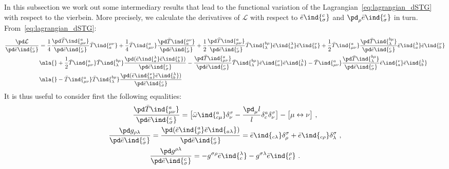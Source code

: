 \documentclass[11pt]{article}
\begin{document}
In this subsection we work out some intermediary results that 
lead to the functional variation of the 
Lagrangian~\eqref{eq:lagrangian_dSTG} with respect to the 
vierbein. More precisely, we calculate the derivatives of 
$\mathcal{L}$ with respect to $\bar{e}\ind{^c_\sigma}$ and 
$\pd_\rho \bar{e}\ind{^c_\sigma}$ in turn.  
From~\eqref{eq:lagrangian_dSTG}:
\begin{displaymath}
\begin{split}
	\frac{\pd \mathcal{L}}{\pd \bar{e}\ind{^c_\sigma}}
	&= \frac{1}{4} \frac{\pd \bar{T}\ind{^a_{\mu\nu}}}{\pd 
		\bar{e}\ind{^c_\sigma}} \bar{T}\ind{_a^{\mu\nu}}
	+ \frac{1}{4} \bar{T}\ind{^a_{\mu\nu}} \frac{\pd 
		\bar{T}\ind{_a^{\mu\nu}}}{\pd \bar{e}\ind{^c_\sigma}}
	+ \frac{1}{2} \frac{\pd \bar{T}\ind{^a_{\mu\nu}}}{\pd 
		\bar{e}\ind{^c_\sigma}} \bar{T}\ind{^{b\mu}_\lambda} 
	\bar{e}\ind{_a^\lambda} \bar{e}\ind{_b^\nu}
	+ \frac{1}{2} \bar{T}\ind{^a_{\mu\nu}} \frac{\pd 
		\bar{T}\ind{^{b\mu}_\lambda}}{\pd \bar{e}\ind{^c_\sigma}} 
	\bar{e}\ind{_a^\lambda} \bar{e}\ind{_b^\nu}
	\\
	&\nla{} + \frac{1}{2} \bar{T}\ind{^a_{\mu\nu}} 
	\bar{T}\ind{^{b\mu}_\lambda} \frac{\pd( 
		\bar{e}\ind{_a^\lambda} \bar{e}\ind{_b^\nu})}{\pd 
		\bar{e}\ind{^c_\sigma}}
	- \frac{\pd \bar{T}\ind{^a_{\mu\nu}}}{\pd 
		\bar{e}\ind{^c_\sigma}} \bar{T}\ind{^{b\mu}_\lambda} 
	\bar{e}\ind{_a^\nu} \bar{e}\ind{_b^\lambda}
	- \bar{T}\ind{^a_{\mu\nu}} \frac{\pd 
		\bar{T}\ind{^{b\mu}_\lambda}}{\pd \bar{e}\ind{^c_\sigma}} 
	\bar{e}\ind{_a^\nu} \bar{e}\ind{_b^\lambda}
	\\
	&\nla{} - \bar{T}\ind{^a_{\mu\nu}} 
	\bar{T}\ind{^{b\mu}_\lambda} \frac{\pd( \bar{e}\ind{_a^\nu} 
		\bar{e}\ind{_b^\lambda})}{\pd \bar{e}\ind{^c_\sigma}}
\end{split}
\end{displaymath}
It is thus useful to consider first the following equalities:
\begin{gather*}
	\frac{\pd \bar{T}\ind{^a_{\mu\nu}}}{\pd \bar{e}\ind{^c_\sigma}}
	= \big[ \bar{\omega}\ind{^a_{c\mu}} \delta^\sigma_\nu - 
	\frac{\pd_\mu l}{l} \delta^a_c \delta^\sigma_\nu \big] - \big[ 
	\mu \leftrightarrow \nu \big]~,
	\\
	\frac{\pd g_{\rho\lambda}}{\pd \bar{e}\ind{^c_\sigma}} = 
	\frac{\pd (\bar{e}\ind{^a_\rho} \bar{e}\ind{_{a\lambda}})}{\pd 
		\bar{e}\ind{^c_\sigma}} = \bar{e}\ind{_{c\lambda}} 
	\delta^\sigma_\rho + \bar{e}\ind{_{c\rho}} 
	\delta^\sigma_\lambda~,
	\\
	\frac{\pd g^{\rho\lambda}}{\pd \bar{e}\ind{^c_\sigma}} =
	- g^{\sigma\rho} \bar{e}\ind{_c^\lambda} - g^{\sigma\lambda} 
	\bar{e}\ind{_c^\rho}~.
\end{gather*}
\end{document}
